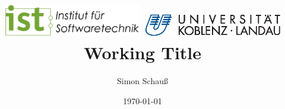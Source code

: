 \title{
	\includegraphics[width=0.45\textwidth, keepaspectratio]{institute-logo.eps}
	\includegraphics[width=0.45\textwidth, keepaspectratio]{university-logo.eps}
	\Huge{
		Working Title
	}
}
\date{
	\small{
		\today
	}
}
\author{Simon Schauß}

\maketitle

